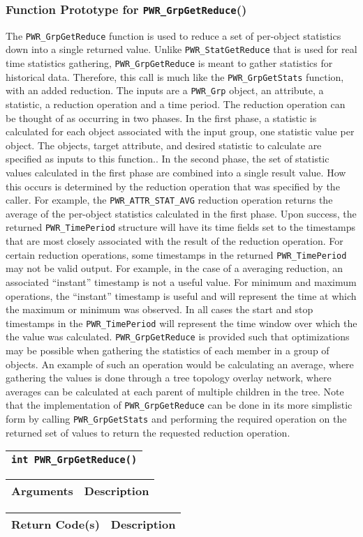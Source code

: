 \documentclass[12pt]{report} %
\makeatletter
\def\PWR#1{\texttt{PWR\_{#1}}}%
\def\null{} %
\def\undecoratedname{}                                  %
\def\longdesc{}                                         %
\def\returns{}                                          %
\def\params{}                                           %
\def\retvals{}                                          %
\def\signatureparams{}                                  %
\def\parameternote{}					%
\newenvironment{prototype}[1]{ %
        \def\undecoratedname{#1} %
}{ %
        \subsubsection{Function Prototype for \PWR{\undecoratedname}()}\label{func:\undecoratedname} %
	\index{\undecoratedname@\PWR{\undecoratedname} \textit{(function)}} %
	\longdesc %
        \vspace{0.1in} %
	\begin{center} %
		\begin{tabular}{| p{13.2cm} |} %
			\hline %
			\noindent\small{\texttt{\returns\ \PWR{\undecoratedname}(\signatureparams)}}\\ %
			\hline %
		\end{tabular} %
	\end{center} %
	\ifx \params\null %
	\else %
		\begin{center} %
			\begin{tabular}{ | p{0.9cm} p{4.8cm} | p{6.7cm} |} %
				\hline %
				\multicolumn{2}{|l|}{\textbf{Arguments}} & \textbf{Description}\marginnote{\scriptsize\parameternote}\\ %
				\hline %
				\params%
				\hline %
			\end{tabular} %
		\end{center} %
	\fi	 %
	\ifx \retvals\null %
	\else %
		\begin{center} %
			\begin{tabular}{ | p{6.1cm} | p{6.8cm} |} %
				\hline %
				\textbf{Return Code(s)} & \textbf{Description} \\ %
				\hline %
				\retvals%
				\hline %
			\end{tabular} %
		\end{center} %
	\fi %
}
\def\longdescription#1{ %
        \def\longdesc{#1} %
}
\def\returntype#1{ %
        \def\returns{#1} %
}
\providecommand{\DIFaddbegin}{} %
\newcommand{\DIFaddincludegraphics}[2][]{{\color{blue}\fbox{\DIFOincludegraphics[#1]{#2}}}} %
\DeclareRobustCommand{\DIFaddbegin}{\DIFOaddbegin \let\includegraphics\DIFaddincludegraphics} %
\makeatother
\begin{document}
\DIFaddbegin \begin{prototype}{GrpGetReduce}
	\longdescription{The \texttt{PWR_GrpGetReduce} function is used to reduce a set of per-object statistics down into a single returned value.  Unlike \texttt{PWR_StatGetReduce} that is used for real time statistics gathering, \texttt{PWR_GrpGetReduce} is meant to gather statistics for historical data.  Therefore, this call is much like the \texttt{PWR_GrpGetStats} function, with an added reduction.  The inputs are a \texttt{PWR_Grp} object, an attribute, a statistic, a reduction operation and a time period.  The reduction operation can be thought of as occurring in two phases.  In the first phase, a statistic is calculated for each object associated with the input group, one statistic value per object.  The objects, target attribute, and desired statistic to calculate are specified as inputs to this function..  In the second phase, the set of statistic values calculated in the first phase are combined into a single result value.  How this occurs is determined by the reduction operation that was specified by the caller.  For example, the \texttt{PWR_ATTR_STAT_AVG} reduction operation returns the average of the per-object statistics calculated in the first phase.  Upon success, the returned \texttt{PWR_TimePeriod} structure will have its time fields set to the timestamps that are most closely associated with the result of the reduction operation.  For certain reduction operations, some timestamps in the returned \texttt{PWR_TimePeriod} may not be valid output.  For example, in the case of a averaging reduction, an associated ``instant'' timestamp is not a useful value.  For minimum and maximum operations, the ``instant'' timestamp is useful and will represent the time at which the maximum or minimum was observed.  In all cases the start and stop timestamps in the \texttt{PWR_TimePeriod} will represent the time window over which the the value was calculated.  \texttt{PWR_GrpGetReduce} is provided such that optimizations may be possible when gathering the statistics of each member in a group of objects.  An example of such an operation would be calculating an average, where gathering the values is done through a tree topology overlay network, where averages can be calculated at each parent of multiple children in the tree.  Note that the implementation of \texttt{PWR_GrpGetReduce} can be done in its more simplistic form by calling \texttt{PWR_GrpGetStats} and performing the required operation on the returned set of values to return the requested reduction operation.}
	\returntype{int}

\end{prototype}
\end{document}
